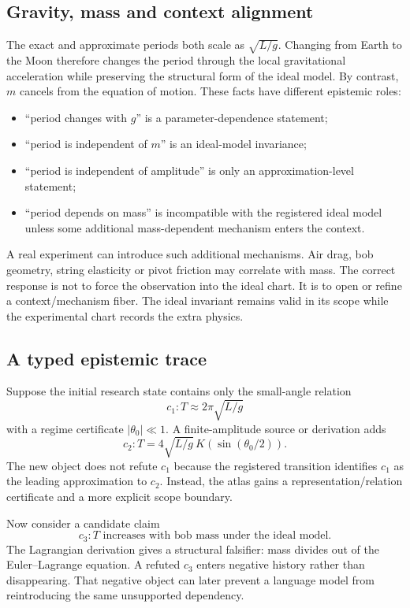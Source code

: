 \documentclass[11pt]{article}
\begin{document}
\subsection{Gravity, mass and context alignment}

The exact and approximate periods both scale as \(\sqrt{L/g}\). Changing from Earth to the Moon therefore changes the period through the local gravitational acceleration while preserving the structural form of the ideal model. By contrast, \(m\) cancels from the equation of motion. These facts have different epistemic roles:

\begin{itemize}[leftmargin=*]
\item ``period changes with \(g\)'' is a parameter-dependence statement;
\item ``period is independent of \(m\)'' is an ideal-model invariance;
\item ``period is independent of amplitude'' is only an approximation-level statement;
\item ``period depends on mass'' is incompatible with the registered ideal model unless some additional mass-dependent mechanism enters the context.
\end{itemize}

A real experiment can introduce such additional mechanisms. Air drag, bob geometry, string elasticity or pivot friction may correlate with mass. The correct response is not to force the observation into the ideal chart. It is to open or refine a context/mechanism fiber. The ideal invariant remains valid in its scope while the experimental chart records the extra physics.

\subsection{A typed epistemic trace}

Suppose the initial research state contains only the small-angle relation
\[
c_1:T\approx2\pi\sqrt{L/g}
\]
with a regime certificate \(|\theta_0|\ll1\). A finite-amplitude source or derivation adds
\[
c_2:T=4\sqrt{L/g}\,K(\sin(\theta_0/2)).
\]
The new object does not refute \(c_1\) because the registered transition identifies \(c_1\) as the leading approximation to \(c_2\). Instead, the atlas gains a representation/relation certificate and a more explicit scope boundary.

Now consider a candidate claim
\[
c_3:T\text{ increases with bob mass under the ideal model}.
\]
The Lagrangian derivation gives a structural falsifier: mass divides out of the Euler--Lagrange equation. A refuted \(c_3\) enters negative history rather than disappearing. That negative object can later prevent a language model from reintroducing the same unsupported dependency.
\end{document}
